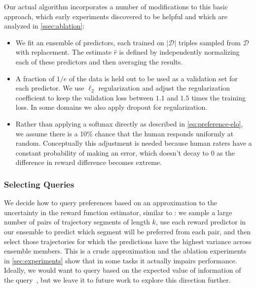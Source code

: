 \documentclass{article}
\def\rest{\hat{r}}  %
\newcommand{\abs}[1]{\left|#1\right|}
\DeclarePairedDelimiter{\pdelims}{(}{)}
\newcommand{\of}[1]{\pdelims*{#1}}
\newcommand{\db}{\mathcal{D}}
\begin{document}
Our actual algorithm incorporates a number of modifications to this basic approach, which early experiments discovered to be helpful and which
are analyzed in \autoref{ssec:ablation}:
\begin{itemize}
\item We fit an ensemble of predictors, each trained on $\abs{\db}$ triples
    sampled from $\db$ with replacement.
    The estimate $\rest$ is defined by independently normalizing each of these predictors and then averaging the results.
\item A fraction of $1/e$ of the data is held out to be used as a validation set for each predictor.
    We use $\ell_2$ regularization and
    adjust the regularization coefficient to keep the validation loss between $1.1$ and $1.5$ times the training loss.
    In some domains we also apply dropout for regularization.
\item Rather than applying a softmax directly as described in \autoref{eq:preference-elo},
    we assume there is a 10\% chance that the human responds uniformly at random.
Conceptually this adjustment is needed because human raters have a constant probability of making an error, which doesn't decay to 0 as the difference in reward difference becomes extreme.
\end{itemize}

\subsubsection{Selecting Queries}  %
\label{sssec:selecting}

We decide how to query preferences based on
an approximation to the uncertainty in the reward function estimator, similar to \citet{Daniel14}:
we sample a large number of pairs of trajectory segments of length $k$,
use each reward predictor in our ensemble
to predict which segment will be preferred from each pair,
and then select those trajectories for which the predictions have the highest variance across ensemble members.
This is a crude approximation and the ablation experiments in \autoref{sec:experiments} show that
in some tasks it actually impairs performance.
Ideally, we would want to query based on the expected value of information of the query~\citep{Akrour12,Krueger16},
but we leave it to future work to explore this direction further.
\end{document}
